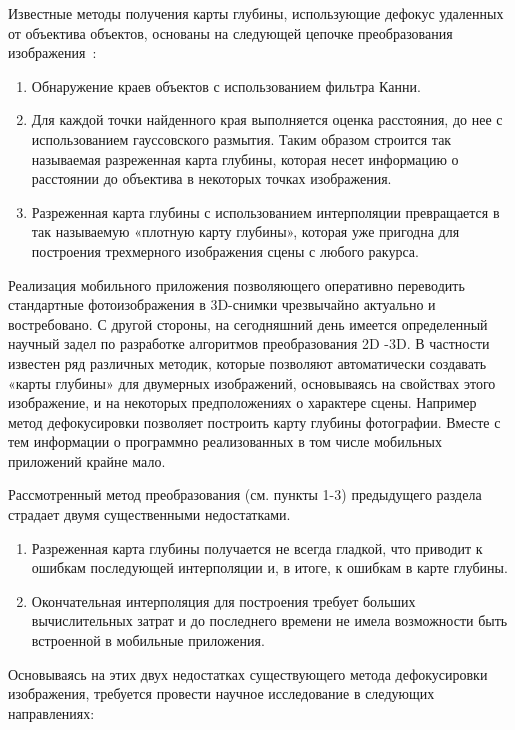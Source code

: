 Известные методы получения карты глубины, использующие дефокус удаленных от объектива объектов, основаны на следующей цепочке преобразования изображения~\cite{depthMap1}:

\begin{enumerate} 
	\item Обнаружение краев объектов с использованием фильтра Канни.
	\item Для каждой точки найденного края выполняется оценка расстояния, до нее с использованием гауссовского размытия. Таким образом строится так называемая разреженная карта глубины, которая несет информацию о расстоянии до объектива в некоторых точках изображения. 
	\item Разреженная карта глубины с использованием интерполяции превращается в так называемую «плотную карту глубины», которая уже пригодна для построения трехмерного изображения сцены с любого ракурса. 
\end{enumerate}

Реализация мобильного приложения позволяющего оперативно переводить стандартные фотоизображения в 3D-снимки чрезвычайно актуально и востребовано.  С другой стороны, на сегодняшний день имеется определенный научный задел по разработке алгоритмов преобразования 2D -3D. В частности известен ряд различных методик, которые позволяют автоматически создавать «карты глубины» для двумерных изображений, основываясь на свойствах этого изображение, и на некоторых предположениях о характере сцены. Например метод дефокусировки позволяет  построить карту глубины фотографии. Вместе с тем информации о программно реализованных в том числе мобильных приложений крайне мало. 

Рассмотренный метод преобразования (см. пункты 1-3) предыдущего раздела страдает двумя существенными недостатками\cite{depthMap2}.

\begin{enumerate}
	\item Разреженная карта глубины получается не всегда гладкой, что приводит к ошибкам последующей интерполяции и, в итоге, к ошибкам в карте глубины. 
	\item Окончательная интерполяция для построения требует больших вычислительных затрат и до последнего времени не имела возможности быть встроенной в мобильные приложения. 
\end{enumerate}

Основываясь на этих двух недостатках существующего метода дефокусировки изображения, требуется провести научное исследование в следующих направлениях:

